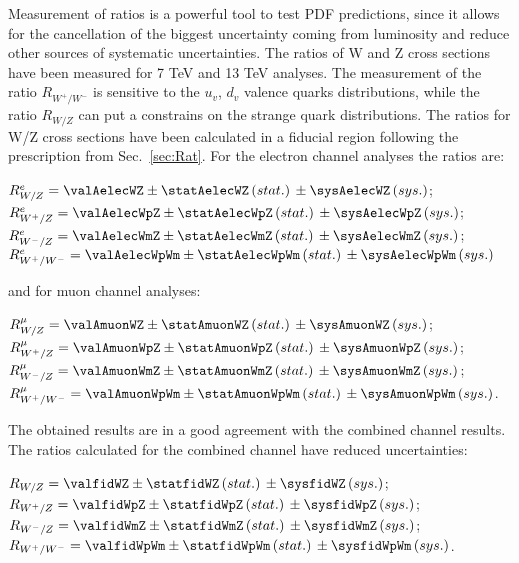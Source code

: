 Measurement of ratios is a powerful tool to test PDF predictions, since it allows for the cancellation of the biggest uncertainty coming from luminosity and reduce other sources of systematic uncertainties. The ratios of W and Z cross sections have been measured for 7 TeV\cite{a7TeV} and 13 TeV\cite{a13TeV} analyses. The measurement of the ratio $R_{W^{+}/W^{-}}$ is sensitive to the $u_{v}$, $d_{v}$ valence quarks distributions, while the ratio $R_{W/Z}$ can put a constrains on the strange quark distributions. The ratios for W/Z cross sections have been calculated in a fiducial region following the prescription from Sec.~\ref{sec:Rat}. For the electron channel analyses the ratios are:
\begin{center}
$R^{e}_{W/Z} = \valAelecWZ \pm \statAelecWZ \, (stat.)\, \pm \sysAelecWZ\, (sys.)$; \\
$R^{e}_{W^{+}/Z} = \valAelecWpZ \pm \statAelecWpZ\, (stat.)\, \pm \sysAelecWpZ \, (sys.)$; \\
$R^{e}_{W^{-}/Z} = \valAelecWmZ \pm \statAelecWmZ\, (stat.)\,  \pm \sysAelecWmZ\,  (sys.)$; \\
$R^{e}_{W^{+}/W^{-}} = \valAelecWpWm \pm \statAelecWpWm\, (stat.)\, \pm \sysAelecWpWm\,  (sys.)$\\
\end{center}
and for muon channel analyses:
\begin{center}
$R^{\mu}_{W/Z} = \valAmuonWZ \pm \statAmuonWZ \, (stat.)\, \pm \sysAmuonWZ\, (sys.)$;\\
$R^{\mu}_{W^{+}/Z} = \valAmuonWpZ \pm \statAmuonWpZ\, (stat.)\, \pm \sysAmuonWpZ \, (sys.)$; \\
$R^{\mu}_{W^{-}/Z} = \valAmuonWmZ \pm \statAmuonWmZ\, (stat.)\,  \pm \sysAmuonWmZ\,  (sys.)$;\\
$R^{\mu}_{W^{+}/W^{-}} = \valAmuonWpWm \pm \statAmuonWpWm\, (stat.)\, \pm \sysAmuonWpWm\,  (sys.)$.\\
\end{center}
The obtained results are in a good agreement with the combined channel results. The ratios calculated for the combined channel have reduced uncertainties:
\begin{center}
$R_{W/Z} = \valfidWZ \pm \statfidWZ \, (stat.)\, \pm \sysfidWZ\, (sys.)$; \\
$R_{W^{+}/Z} = \valfidWpZ \pm \statfidWpZ\, (stat.)\, \pm \sysfidWpZ \, (sys.)$; \\
$R_{W^{-}/Z} = \valfidWmZ \pm \statfidWmZ\, (stat.)\,  \pm \sysfidWmZ\,  (sys.)$; \\
$R_{W^{+}/W^{-}} = \valfidWpWm \pm \statfidWpWm\, (stat.)\, \pm \sysfidWpWm\,  (sys.)$. \\
\end{center}

